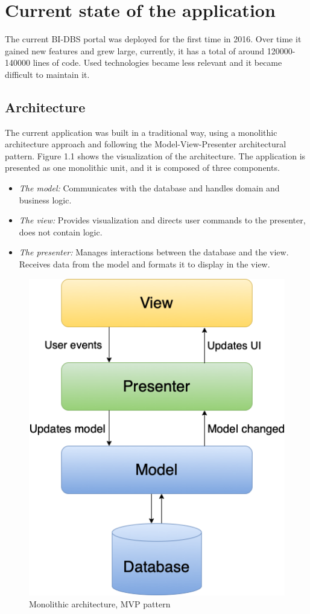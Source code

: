 \section{Current state of the application}
The current BI-DBS portal was deployed for the first time in 2016\cite{bt-malec}. Over time it gained new features and grew large, currently, it has a total of around 120000-140000 lines of code\cite{mt-plyskach}. Used technologies became less relevant and it became difficult to maintain it.

\subsection{Architecture}
The current application was built in a traditional way, using a monolithic architecture approach and following the Model-View-Presenter architectural pattern\cite{mvp-potel}\cite{architecture-haris}. Figure 1.1 shows the visualization of the architecture. The application is presented as one monolithic unit, and it is composed  of three components. 

\begin{itemize}
  \item \emph{The model:} Communicates with the database and handles domain and business logic.
  \item \emph{The view:} Provides visualization and directs user commands to the presenter, does not contain logic.
  \item \emph{The presenter:} Manages interactions between the database and the view. Receives data from the model and formats it to display in the view.
\end{itemize}

\begin{figure}[hp]
\centering
\includegraphics[scale=0.52]{../png/mvp_monolithic.png}
\caption{Monolithic architecture, MVP pattern}
\end{figure}

